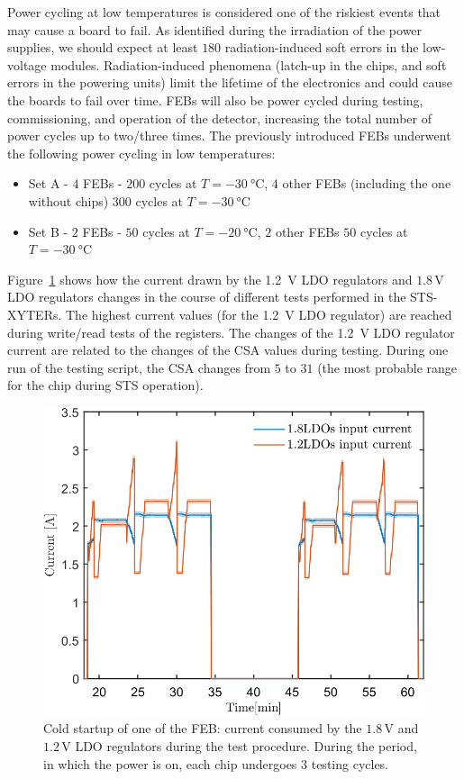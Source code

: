 Power cycling at low temperatures is considered one of the riskiest events that may cause a board to fail.  As identified during the irradiation of the power supplies, we should expect at least $180$ radiation-induced soft errors in the low-voltage modules. Radiation-induced phenomena (latch-up in the chips, and soft errors in the powering units) limit the lifetime of the electronics and could cause the boards to fail over time. \glspl{FEB} will also be power cycled during testing, commissioning, and operation of the detector, increasing the total number of power cycles up to two/three times. The previously introduced \glspl{FEB} underwent the following power cycling in low temperatures:
\begin{itemize}
    \item Set A - $4$ \glspl{FEB} - $200$ cycles at $T = \SI{-30}{\celsius}$, $4$ other \glspl{FEB} (including the one without chips) $300$ cycles at $T = \SI{-30}{\celsius}$
    \item Set B - $2$ \glspl{FEB} - $50$ cycles at $T = \SI{-20}{\celsius}$, $2$ other \glspl{FEB} $50$ cycles at $T = \SI{-30}{\celsius}$
\end{itemize}
Figure~\ref{fig_power_cycle} shows how the current drawn by the 1.2~V \gls{LDO} regulators and $1.8$\,V \gls{LDO} regulators changes in the course of different tests performed in the STS-XYTERs. The highest current values (for the \SI{1.2}{\volt} LDO regulator) are reached during write/read tests of the registers. The changes of the \SI{1.2}{\volt} LDO regulator current are related to the changes of the \gls{CSA} values during testing. During one run of the testing script, the \gls{CSA} changes from $5$ to $31$ (the most probable range for the chip during STS operation). 
\begin{figure}[!h]
\centering
\includegraphics[width=0.6\columnwidth]{Chapter4/images/currents.png}
\caption{Cold startup of one of the \gls{FEB}: current consumed by the $1.8$\,V and $1.2$\,V \gls{LDO} regulators during the test procedure. During the period, in which the power is on, each chip undergoes 3 testing cycles.}
\label{fig_power_cycle}
\end{figure}
